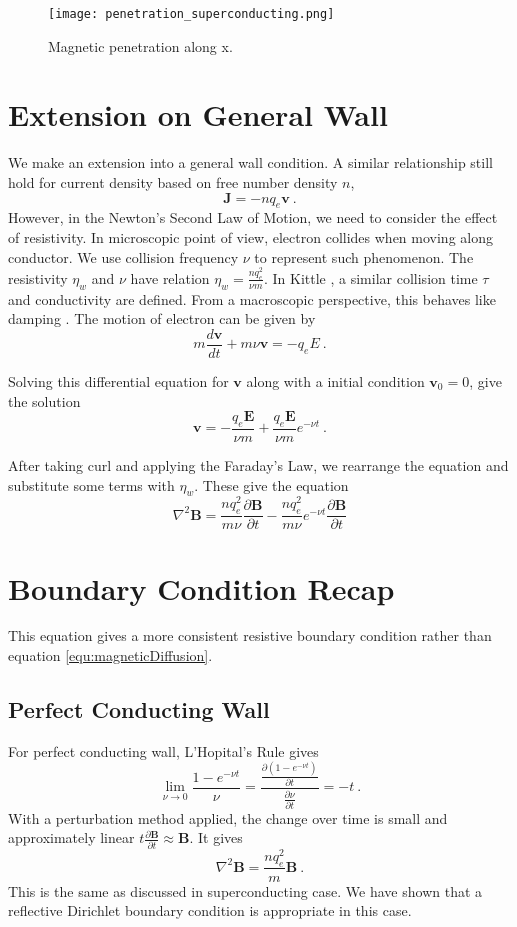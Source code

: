 \begin{figure}[H]
	\centering
	\texttt{[image: penetration\_superconducting.png]}
	\caption[Bx Distribution]{Magnetic penetration along x.}
	\label{fig:PenetrationCurveSuperconducting}
\end{figure}

\section{Extension on General Wall}
We make an extension into a general wall condition. A similar relationship still hold for current density based on free number density $n$,  
$$
\mathbf{J}=-n q_e \mathbf{v}\ .
$$
However, in the Newton's Second Law of Motion, we need to consider the effect of resistivity. In microscopic point of view, electron collides when moving along conductor. We use collision frequency $\nu$ to represent such phenomenon. The resistivity $\eta_w$ and $\nu$ have relation $\eta_w=\frac{nq_e^2}{\nu m}$. In Kittle \cite{kittel2018introduction}, a similar collision time $\tau$ and conductivity are defined. From a macroscopic perspective, this behaves like damping \cite{kittel2018introduction}. The motion of electron can be given by 
$$
m\frac{d\mathbf{v}}{dt}+m\nu \mathbf{v}=-q_eE\ .
$$

Solving this differential equation for $\mathbf{v}$ along with a initial condition $\mathbf{v}_0=0$, give the solution 
$$
\mathbf{v}=-\frac{q_e\mathbf{E}}{\nu m}+\frac{q_e\mathbf{E}}{\nu m}e^{-\nu t}\ .
$$

After taking curl and applying the Faraday's Law, we rearrange the equation and substitute some terms with $\eta_w$. These give the equation
\begin{equation}
	\nabla^2\mathbf{B}=\frac{nq_e^2}{m\nu}\frac{\partial \mathbf{B}}{\partial t}-\frac{nq_e^2}{m\nu}e^{-\nu t}\frac{\partial \mathbf{B}}{\partial t}
\end{equation}

\section{Boundary Condition Recap} 
This equation gives a more consistent resistive boundary condition rather than equation \ref{equ:magneticDiffusion}.
\subsection*{Perfect Conducting Wall}
For perfect conducting wall, L'Hopital's Rule gives $$
\lim_{\nu \to 0}\frac{1-e^{-\nu t}}{\nu}=\frac{\frac{\partial(1-e^{-\nu t})}{\partial t}}{\frac{\partial\nu}{\partial t}}=-t\ .
$$ 
With a perturbation method applied, the change over time is small and approximately linear $t\frac{\partial \mathbf{B}}{\partial t}\approx\mathbf{B}$. It gives 
$$
\nabla^2\mathbf{B}=\frac{n q_e^2}{m}\mathbf{B}\ .
$$
This is the same as discussed in superconducting case. We have shown that a reflective Dirichlet boundary condition is appropriate in this case.

